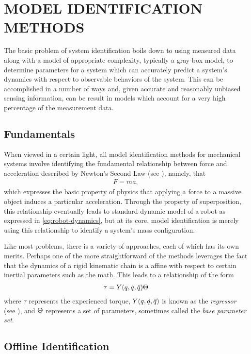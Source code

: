 \chapter{\uppercase{Model Identification Methods}}

The basic problem of system identification boils down to using measured data
along with a model of appropriate complexity, typically a gray-box model, to
determine parameters for a system which can accurately predict a system's
dynamics with respect to observable behaviors of the system.
%
This can be accomplished in a number of ways and, given accurate and
reasonably unbiased sensing information, can be result in models which
account for a very high percentage of the measurement data.
%

\section{Fundamentals}
When viewed in a certain light, all model identification methods for mechanical
systems involve identifying the fundamental relationship between force and
acceleration described by Newton's Second Law (see \cite{feynman1963}), namely,
that
\begin{align}
  \label{eq:newtons-second}
  F = m a,
\end{align}
which expresses the basic property of physics that applying a force to a massive
object induces a particular acceleration.
%
Through the property of superposition, this relationship eventually leads to
standard dynamic model of a robot as expressed in \ref{eq:robot-dynamics}, but
at its core, model identification is merely using this relationship to identify
a system's mass configuration.

Like most problems, there is a variety of approaches, each of which has its own
merits.
%
Perhaps one of the more straightforward of the methods leverages the fact that
the dynamics of a rigid kinematic chain is a affine with respect to certain
inertial parameters such as the math.
%
This leads to a relationship of the form
\begin{align}
  \label{eq:regressor}
  \tau = Y(q, \dot{q}, \ddot{q}) \Theta
\end{align}
where $\tau$ represents the experienced torque, $Y(q, \dot{q}, \ddot{q})$ is known as the
{\em regressor} (see \cite{spong1989}), and $\Theta$ represents a set
of parameters, sometimes called the {\em base parameter set}.

\section{Offline Identification}

